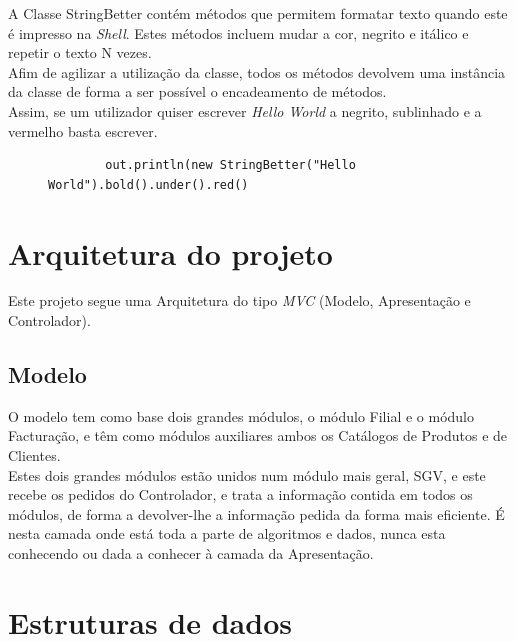 \documentclass[a4paper]{report}
\begin{document}
A Classe StringBetter contém métodos que permitem formatar texto quando este é impresso na
\textit{Shell}. Estes métodos incluem mudar a cor, negrito e itálico e repetir o texto N vezes.\\
Afim de agilizar a utilização da classe, todos os métodos devolvem uma instância da classe
de forma a ser possível o encadeamento de métodos.\\
Assim, se um utilizador quiser escrever \textit{Hello World} a negrito, sublinhado e a
vermelho basta escrever.
\begin{figure}[H]
    \begin{center}
        \begin{verbatim}
        out.println(new StringBetter("Hello World").bold().under().red()
        \end{verbatim}
    \end{center}
\end{figure}

\chapter{Arquitetura do projeto}

Este projeto segue uma Arquitetura do tipo \textit{MVC} (Modelo, Apresentação e
Controlador).

\section{Modelo}

O modelo tem como base dois grandes módulos, o módulo Filial e o módulo Facturação,
e têm como módulos auxiliares ambos os Catálogos de Produtos e de Clientes.\\
Estes dois grandes módulos estão unidos num módulo mais geral, SGV, e este recebe
os pedidos do Controlador, e trata a informação contida em todos os módulos, de 
forma a devolver-lhe a informação pedida da forma mais eficiente. É nesta camada
onde está toda a parte de algoritmos e dados, nunca esta conhecendo ou dada a
conhecer à camada da Apresentação.

\chapter{Estruturas de dados}
\end{document}
